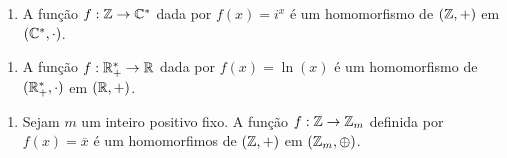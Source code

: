 \documentclass{beamer}
\begin{document}
    \begin{frame}
        \begin{exemplos}
            \begin{enumerate}[label={\arabic*})]
                \item A função $f : \mathbb{Z} \to \mathbb{C}^*$ \pause dada por $f(x) = i^x$ \pause é um homomorfismo de $(\mathbb{Z}, +)$ \pause em $(\mathbb{C}^*, \cdot)$.
                \seti
            \end{enumerate}

            \vspace{2cm}
        \end{exemplos}
    \end{frame}
    \begin{frame}
        \begin{exemplos}
            \begin{enumerate}[label={\arabic*})]
                \conti

                \item A função $f : \mathbb{R}^*_+ \to \mathbb{R}$ \pause dada por $f(x) = \ln(x)$ \pause é um homomorfismo de $(\mathbb{R}^*_+, \cdot)$ \pause em $(\mathbb{R}, +)$.
                \seti
            \end{enumerate}
            \vspace{2cm}
        \end{exemplos}
    \end{frame}
    \begin{frame}
        \begin{exemplos}
            \begin{enumerate}[label={\arabic*})]
                \conti

                \item Sejam $m$ um inteiro positivo fixo. \pause A função $f: \mathbb{Z} \to \mathbb{Z}_m$ \pause definida por $f(x) = \overline{x}$ \pause é um homomorfimos de $(\mathbb{Z}, +)$ \pause em $(\mathbb{Z}_m, \oplus)$.
                \seti
            \end{enumerate}
            \vspace{2cm}
        \end{exemplos}
    \end{frame}
\end{document}
